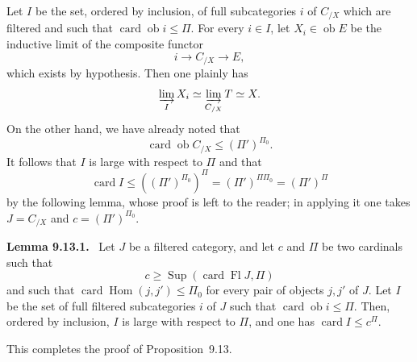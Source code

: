 \documentclass[11pt]{article}
\newcommand{\ob}{\operatorname{ob}}
\newcommand{\Hom}{\operatorname{Hom}}
\newcommand{\Sup}{\operatorname{Sup}}
\newcommand{\card}{\operatorname{card}}
\newcommand{\Fl}{\operatorname{Fl}}
\newenvironment{statement}[1]{\par\medskip\noindent\textbf{#1.}\ }{\par\medskip}
\begin{document}
Let $I$ be the set, ordered by inclusion, of full subcategories $i$ of $C_{/X}$ which are filtered and such that $\card\ob i\leq\Pi$. For every $i\in I$, let $X_i\in\ob E$ be the inductive limit of the composite functor
\[
 i\longrightarrow C_{/X}\longrightarrow E,
\]
which exists by hypothesis. Then one plainly has
\[
 \varinjlim_I X_i\simeq \varinjlim_{C_{/X}}T\simeq X.
\]
On the other hand, we have already noted that
\[
 \card\ob C_{/X}\leq(\Pi')^{\Pi_0}.
\]
It follows that $I$ is large with respect to $\Pi$ and that
\[
 \card I\leq ((\Pi')^{\Pi_0})^\Pi=(\Pi')^{\Pi\Pi_0}=(\Pi')^\Pi
\]
by the following lemma, whose proof is left to the reader; in applying it one takes $J=C_{/X}$ and $c=(\Pi')^{\Pi_0}$.

\begin{statement}{Lemma 9.13.1}
Let $J$ be a filtered category, and let $c$ and $\Pi$ be two cardinals such that
\[
 c\geq\Sup(\card\Fl J,\Pi)
\]
and such that $\card\Hom(j,j')\leq\Pi_0$ for every pair of objects $j,j'$ of $J$. Let $I$ be the set of full filtered subcategories $i$ of $J$ such that $\card\ob i\leq\Pi$. Then, ordered by inclusion, $I$ is large with respect to $\Pi$, and one has $\card I\leq c^\Pi$.
\end{statement}

This completes the proof of Proposition~9.13.
\end{document}
